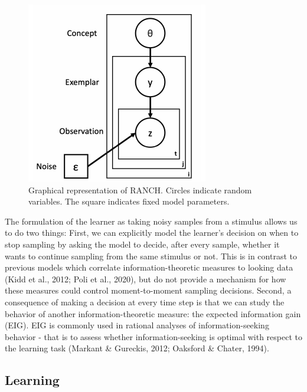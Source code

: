 \documentclass[10pt, letterpaper]{article}
\newenvironment{CodeChunk}{}{}
\begin{document}
\begin{CodeChunk}
\begin{figure}[H]

{\centering \includegraphics{figs/plate_diagram-1} 

}

\caption[Graphical representation of RANCH]{Graphical representation of RANCH. Circles indicate random variables. The square indicates fixed model parameters.}\label{fig:plate_diagram}
\end{figure}
\end{CodeChunk}

The formulation of the learner as taking noisy samples from a stimulus
allows us to do two things: First, we can explicitly model the learner's
decision on when to stop sampling by asking the model to decide, after
every sample, whether it wants to continue sampling from the same
stimulus or not. This is in contrast to previous models which correlate
information-theoretic measures to looking data (Kidd et al., 2012; Poli
et al., 2020), but do not provide a mechanism for how these measures
could control moment-to-moment sampling decisions. Second, a consequence
of making a decision at every time step is that we can study the
behavior of another information-theoretic measure: the expected
information gain (EIG). EIG is commonly used in rational analyses of
information-seeking behavior - that is to assess whether
information-seeking is optimal with respect to the learning task
(Markant \& Gureckis, 2012; Oaksford \& Chater, 1994).

\hypertarget{learning}{%
\subsection{Learning}\label{learning}}
\end{document}
